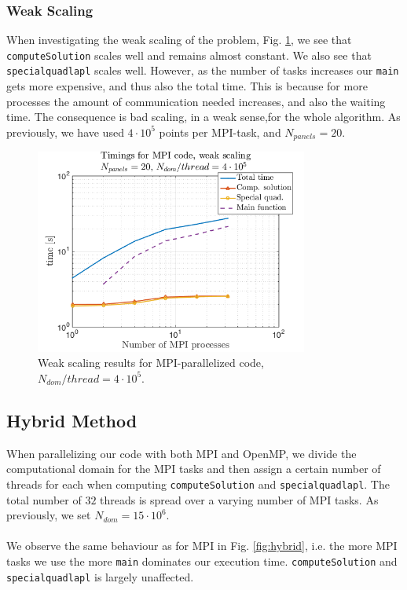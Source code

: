 \documentclass[a4paper,10pt]{article}
\def\code#1{\texttt{#1}}
\begin{document}
\subsubsection*{Weak Scaling}
When investigating the weak scaling of the problem, Fig. \ref{fig:mpi_weaktime}, we see that \code{computeSolution} scales well and remains almost constant. We also see that \code{specialquadlapl} scales well. However, as the number of tasks increases our \code{main} gets more expensive, and thus also the total time. This is because for more processes the amount of communication needed increases, and also the waiting time. The consequence is bad scaling, in a weak sense,for the whole algorithm. As previously, we have used $4\cdot 10^5$ points per MPI-task, and $N_{panels}=20$.
\begin{figure}[ht]
    \begin{center}
        \includegraphics[width=0.8\textwidth]{Graphics/craypat_mpi_weakscaling.png}
    \end{center}
    \caption{Weak scaling results for MPI-parallelized code, $N_{dom}/thread=4\cdot 10^5$.}
    \label{fig:mpi_weaktime}
\end{figure}


\FloatBarrier

\subsection*{Hybrid Method}
When parallelizing our code with both MPI and OpenMP, we divide the computational domain for the MPI tasks and then assign a certain number of threads for each when computing \code{computeSolution} and \code{specialquadlapl}. The total number of $32$ threads is spread over a varying number of MPI tasks. As previously, we set $N_{dom}=15\cdot10^6$. 
\\ \\
We observe the same behaviour as for MPI in Fig. \ref{fig:hybrid}, i.e. the more MPI tasks we use the more \code{main} dominates our execution time. \code{computeSolution} and \code{specialquadlapl} is largely unaffected.  
\end{document}
